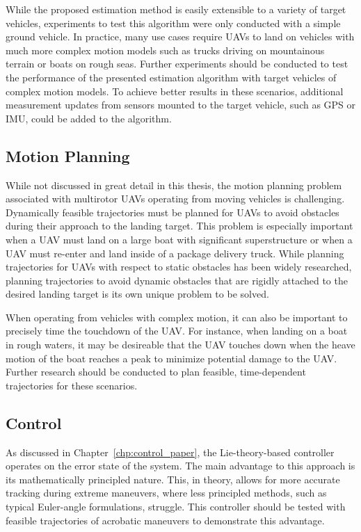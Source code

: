 While the proposed estimation method is easily extensible to a variety of
target vehicles, experiments to test this algorithm were only conducted
with a simple ground vehicle.
In practice, many use cases require UAVs to land on
vehicles with much more complex motion models such as trucks driving on
mountainous terrain or boats on rough seas.
Further experiments should be conducted to test the performance of the presented
estimation algorithm with target vehicles of complex motion models.
To achieve better results in these scenarios, additional measurement updates
from sensors mounted to the target vehicle, such as GPS or IMU,
could be added  to the algorithm.

\subsection{Motion Planning}
\label{sec:future_motion_planning}
While not discussed in great detail in this thesis, the motion planning problem
associated with multirotor UAVs operating from moving vehicles is 
challenging.
Dynamically feasible trajectories must be planned for UAVs to avoid
obstacles during their approach to the landing target.
This problem is especially important when a UAV must land on a large boat
with significant superstructure or when a UAV must re-enter and land inside of a
package delivery truck. While planning trajectories for UAVs with respect to
static obstacles has been widely researched, planning trajectories to avoid
dynamic obstacles that are rigidly attached to the desired landing target is its
own unique problem to be solved.

When operating from vehicles with complex motion, 
it can also be important to precisely time the touchdown of the UAV.
For instance, when landing on a boat in rough
waters, it may be desireable that the UAV touches down when the heave motion of the
boat reaches a peak to minimize potential damage to the UAV.
Further research should be conducted to plan feasible, time-dependent
trajectories for these scenarios.


\subsection{Control}
As discussed in Chapter~\ref{chp:control_paper}, the Lie-theory-based controller
operates on the error state of the system.
The main advantage to this approach is its mathematically principled nature.
This, in
theory, allows for more accurate tracking during extreme maneuvers, where
less principled methods, such as typical Euler-angle formulations, struggle.
This controller should be tested with feasible trajectories of acrobatic
maneuvers to demonstrate this advantage.


